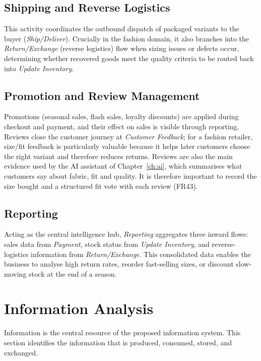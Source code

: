 \documentclass[11pt,a4paper,oneside]{extreport}
\newif\ifshowvtwo
\newcommand{\upd}[1]{\ifshowvtwo\textcolor{red}{#1}\else#1\fi}
\begin{document}
\subsection{Shipping and Reverse Logistics}
\label{subsec:shipping}
This activity coordinates the outbound dispatch of packaged variants to the buyer (\emph{Ship/Deliver}). Crucially in the fashion domain, it also branches into the \emph{Return/Exchange} (reverse logistics) flow when sizing issues or defects occur, determining whether recovered goods meet the quality criteria to be routed back into \emph{Update Inventory}.

\subsection{Promotion and Review Management}
Promotions (seasonal sales, flash sales, loyalty discounts) are applied during checkout and payment, and their effect on sales is visible through reporting. Reviews close the customer journey at \emph{Customer Feedback}; for a fashion retailer, size/fit feedback is particularly valuable because it helps later customers choose the right variant and therefore reduces returns. \upd{Reviews are also the main evidence used by the AI assistant of Chapter~\ref{ch:ai}, which summarises what customers say about fabric, fit and quality. It is therefore important to record the size bought and a structured fit vote with each review (FR43).}

\subsection{Reporting}
Acting as the central intelligence hub, \emph{Reporting} aggregates three inward flows: sales data from \emph{Payment}, stock status from \emph{Update Inventory}, and reverse-logistics information from \emph{Return/Exchange}. This consolidated data enables the business to analyse high return rates, reorder fast-selling sizes, or discount slow-moving stock at the end of a season.

\section{Information Analysis}
\label{sec:information}
Information is the central resource of the proposed information system. This section identifies the information that is produced, consumed, stored, and exchanged.
\end{document}
